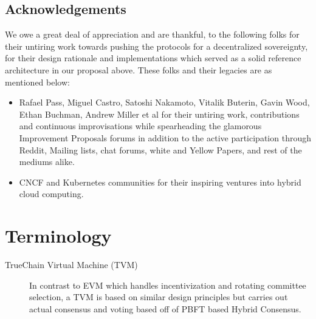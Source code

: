 \documentclass[9pt,oneside]{amsart}
\begin{document}
\begin{multicols}{2}
\section{Acknowledgements}

We owe a great deal of appreciation and are thankful, to the following folks for their untiring work towards pushing the protocols
for a decentralized sovereignty, for their design rationale and implementations which served as a solid reference architecture
in our proposal above. These folks and their legacies are as mentioned below:

\begin{itemize}
  \item Rafael Pass, Miguel Castro, Satoshi Nakamoto, Vitalik Buterin, Gavin Wood, Ethan Buchman, Andrew Miller et al
  for their untiring work, contributions and continuous improvisations while spearheading the glamorous Improvement Proposals forums in
  addition to the active participation through Reddit, Mailing lists, chat forums, white and Yellow Papers, and rest of the mediums alike.
  \item CNCF and Kubernetes communities for their inspiring ventures into hybrid cloud computing.
\end{itemize}



\end{multicols}




\appendix

\section{Terminology} \label{ch:Terminology}

\begin{description}
\item[TrueChain Virtual Machine (TVM)] In contrast to EVM which handles incentivization and rotating committee selection,
  a TVM is based on similar design principles but carries out actual consensus and voting based off of PBFT based Hybrid Consensus.
\end{description}
\end{document}
